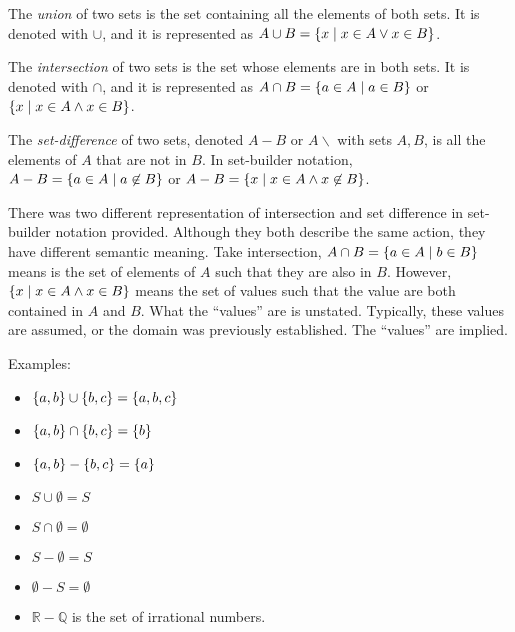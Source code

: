 \bigskip
\begin{definition}
    The \emph{union} of two sets is the set containing all the elements of both sets. It is denoted with \(\cup\), and it is represented as \(A\cup B=\{x\mid x\in A\lor x\in B\}\).
\end{definition}

\bigskip
\begin{definition}
    The \emph{intersection} of two sets is the set whose elements are in both sets. It is denoted with \(\cap\), and it is represented as \(A\cap B=\{a\in A\mid a\in B\}\) or
    \(\{x\mid x\in A\land x\in B\}\).
\end{definition}

\bigskip
\begin{definition}
    The \emph{set-difference} of two sets, denoted \(A-B\) or \(A\backslash\) with sets \(A,B\), is all the elements of \(A\) that are not in \(B\). In set-builder notation,
    \(A-B=\{a\in A\mid a\not\in B\}\) or \(A-B=\{x\mid x\in A\land x\not\in B\}\).
\end{definition}

There was two different representation of intersection and set difference in set-builder notation provided. Although they both describe the same action, they have different semantic meaning.
Take intersection, \(A\cap B=\{a\in A\mid b\in B\}\) means is the set of elements of \(A\) such that they are also in \(B\). However, \(\{x\mid x\in A\land x\in B\}\) means the set 
of values such that the value are both contained in \(A\) and \(B\). What the ``values'' are is unstated. Typically, these values are assumed, or the domain was previously established. The
``values'' are implied.

Examples:
\begin{itemize}
    \item \(\{a,b\}\cup\{b,c\}=\{a,b,c\}\)
    \item \(\{a,b\}\cap\{b,c\}=\{b\}\)
    \item \(\{a,b\}-\{b,c\}=\{a\}\)
    \item \(S\cup\emptyset=S\)
    \item \(S\cap\emptyset=\emptyset\)
    \item \(S-\emptyset=S\)
    \item \(\emptyset-S=\emptyset\)
    \item \(\mathbb{R}-\mathbb{Q}\) is the set of irrational numbers.
\end{itemize}

